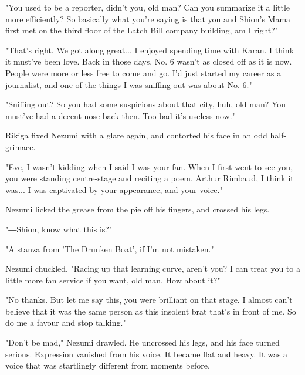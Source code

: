 "You used to be a reporter, didn't you, old man? Can you summarize it a
little more efficiently? So basically what you're saying is that you and
Shion's Mama first met on the third floor of the Latch Bill company
building, am I right?"

"That's right. We got along great... I enjoyed spending time with Karan.
I think it must've been love. Back in those days, No. 6 wasn't as closed
off as it is now. People were more or less free to come and go. I'd just
started my career as a journalist, and one of the things I was sniffing
out was about No. 6."

"Sniffing out? So you had some suspicions about that city, huh, old man?
You must've had a decent nose back then. Too bad it's useless now."

Rikiga fixed Nezumi with a glare again, and contorted his face in an odd
half-grimace.

"Eve, I wasn't kidding when I said I was your fan. When I first went to
see you, you were standing centre-stage and reciting a poem. Arthur
Rimbaud, I think it was... I was captivated by your appearance, and your
voice."

Nezumi licked the grease from the pie off his fingers, and crossed his
legs.


"―Shion, know what this is?"

"A stanza from 'The Drunken Boat', if I'm not mistaken."

Nezumi chuckled. "Racing up that learning curve, aren't you? I can treat
you to a little more fan service if you want, old man. How about it?"

"No thanks. But let me say this, you were brilliant on that stage. I
almost can't believe that it was the same person as this insolent brat
that's in front of me. So do me a favour and stop talking."

"Don't be mad," Nezumi drawled. He uncrossed his legs, and his face
turned serious. Expression vanished from his voice. It became flat and
heavy. It was a voice that was startlingly different from moments
before.

